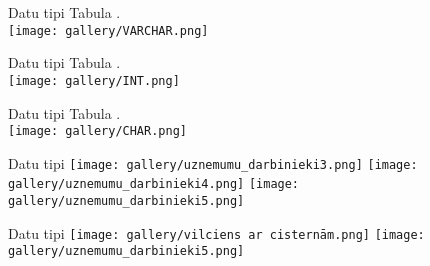 \documentclass{beamer}
\begin{document}
        \begin{frame}[fragile]{Datu tipi}
   \vspace*{0.5cm}
   \hspace*{1cm}
    Tabula \texttt{\color[RGB]{1, 0, 92}{Uznemumu\_darbinieki}}.\\
    \vspace*{0.3cm}
    \hspace*{2cm}
    \texttt{[image: gallery/VARCHAR.png]}
    \end{frame}

   \begin{frame}[fragile]{Datu tipi}
   \vspace*{0.5cm}
   \hspace*{1cm}
    Tabula \texttt{\color[RGB]{1, 0, 92}{Uznemumu\_darbinieki}}.\\
    \vspace*{0.3cm}
    \hspace*{2cm}
    \texttt{[image: gallery/INT.png]}
    \end{frame}

       \begin{frame}[fragile]{Datu tipi}
   \vspace*{0.5cm}
   \hspace*{1cm}
    Tabula \texttt{\color[RGB]{1, 0, 92}{Uznemumu\_darbinieki}}.\\
    \vspace*{0.3cm}
    \hspace*{2cm}
    \texttt{[image: gallery/CHAR.png]}
    \end{frame}

    \begin{frame}[fragile]{Datu tipi}
     \hspace*{1cm}
     \vspace*{0.3cm}
    \texttt{[image: gallery/uznemumu\_darbinieki3.png]} \pause
    \vspace*{0.3cm}
    \hspace*{4cm}
    \texttt{[image: gallery/uznemumu\_darbinieki4.png]}\pause
     \vspace*{0.3cm}
     \hspace*{1cm}
    \texttt{[image: gallery/uznemumu\_darbinieki5.png]}
    \end{frame}

        \begin{frame}[fragile]{Datu tipi}
     \hspace*{1cm}
     \vspace*{0.3cm}
    \texttt{[image: gallery/vilciens ar cisternām.png]} 
     \vspace*{0.3cm}
     \hspace*{1cm}
    \texttt{[image: gallery/uznemumu\_darbinieki5.png]}
    \end{frame}
\end{document}
